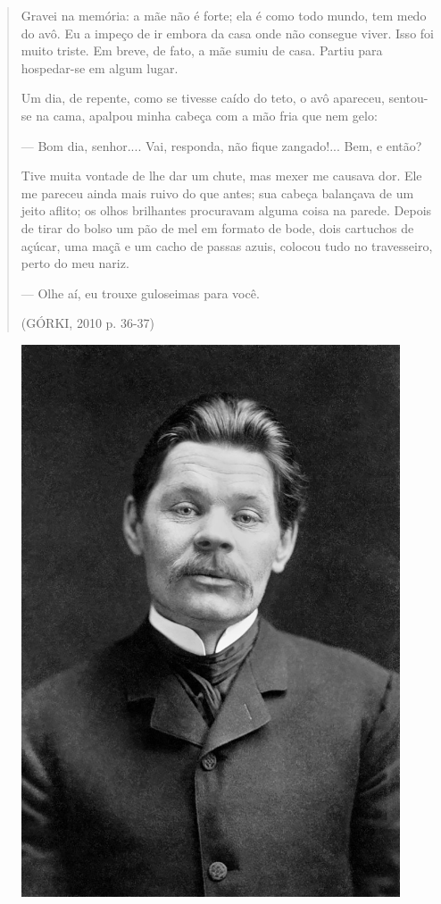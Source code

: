 \documentclass{article}
\begin{document}
\begin{quote}
Gravei na memória: a mãe não é forte; ela é como todo mundo, tem medo do
avô. Eu a impeço de ir embora da casa onde não consegue viver. Isso foi
muito triste. Em breve, de fato, a mãe sumiu de casa. Partiu para
hospedar-se em algum lugar.

Um dia, de repente, como se tivesse caído do teto, o avô apareceu,
sentou-se na cama, apalpou minha cabeça com a mão fria que nem gelo:

--- Bom dia, senhor.... Vai, responda, não fique zangado!... Bem, e
então?

Tive muita vontade de lhe dar um chute, mas mexer me causava dor. Ele me
pareceu ainda mais ruivo do que antes; sua cabeça balançava de um jeito
aflito; os olhos brilhantes procuravam alguma coisa na parede. Depois de
tirar do bolso um pão de mel em formato de bode, dois cartuchos de
açúcar, uma maçã e um cacho de passas azuis, colocou tudo no
travesseiro, perto do meu nariz.

--- Olhe aí, eu trouxe guloseimas para você.

(GÓRKI, 2010 p. 36-37)
\end{quote}

\begin{figure}[ht!]
\includegraphics[width=\textwidth]{./images/PNLD0049-08.png}
\end{figure}
\end{document}
